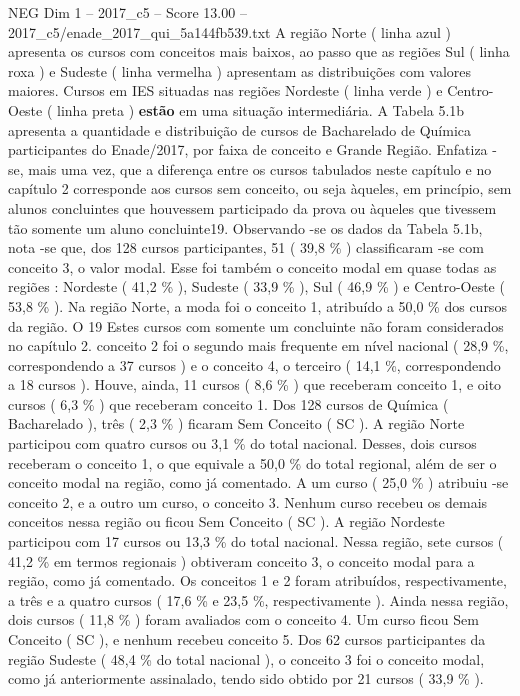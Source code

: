 \begin{textsample}{NEG Dim 1 – 2017\_c5 – Score 13.00 – 2017\_c5/enade\_2017\_qui\_5a144fb539.txt}
A região Norte ( linha azul ) apresenta os cursos com conceitos mais baixos, ao passo que as regiões Sul ( linha roxa ) e Sudeste ( linha vermelha ) apresentam as distribuições com valores maiores.
Cursos em IES situadas nas regiões Nordeste ( linha verde ) e Centro-Oeste ( linha preta ) \textbf{estão} em uma situação intermediária.
A Tabela 5.1b apresenta a quantidade e distribuição de cursos de Bacharelado de Química participantes do Enade/2017, por faixa de conceito e Grande Região.
Enfatiza -se, mais uma vez, que a diferença entre os cursos tabulados neste capítulo e no capítulo 2 corresponde aos cursos sem conceito, ou seja àqueles, em princípio, sem alunos concluintes que houvessem participado da prova ou àqueles que tivessem tão somente um aluno concluinte19.
Observando -se os dados da Tabela 5.1b, nota -se que, dos 128 cursos participantes, 51 ( 39,8 \% ) classificaram -se com conceito 3, o valor modal.
Esse foi também o conceito modal em quase todas as regiões : Nordeste ( 41,2 \% ), Sudeste ( 33,9 \% ), Sul ( 46,9 \% ) e Centro-Oeste ( 53,8 \% ).
Na região Norte, a moda foi o conceito 1, atribuído a 50,0 \% dos cursos da região.
O 19 Estes cursos com somente um concluinte não foram considerados no capítulo 2. conceito 2 foi o segundo mais frequente em nível nacional ( 28,9 \%, correspondendo a 37 cursos ) e o conceito 4, o terceiro ( 14,1 \%, correspondendo a 18 cursos ).
Houve, ainda, 11 cursos ( 8,6 \% ) que receberam conceito 1, e oito cursos ( 6,3 \% ) que receberam conceito 1.
Dos 128 cursos de Química ( Bacharelado ), três ( 2,3 \% ) ficaram Sem Conceito ( SC ).
A região Norte participou com quatro cursos ou 3,1 \% do total nacional.
Desses, dois cursos receberam o conceito 1, o que equivale a 50,0 \% do total regional, além de ser o conceito modal na região, como já comentado.
A um curso ( 25,0 \% ) atribuiu -se conceito 2, e a outro um curso, o conceito 3.
Nenhum curso recebeu os demais conceitos nessa região ou ficou Sem Conceito ( SC ).
A região Nordeste participou com 17 cursos ou 13,3 \% do total nacional.
Nessa região, sete cursos ( 41,2 \% em termos regionais ) obtiveram conceito 3, o conceito modal para a região, como já comentado.
Os conceitos 1 e 2 foram atribuídos, respectivamente, a três e a quatro cursos ( 17,6 \% e 23,5 \%, respectivamente ).
Ainda nessa região, dois cursos ( 11,8 \% ) foram avaliados com o conceito 4.
Um curso ficou Sem Conceito ( SC ), e nenhum recebeu conceito 5.
Dos 62 cursos participantes da região Sudeste ( 48,4 \% do total nacional ), o conceito 3 foi o conceito modal, como já anteriormente assinalado, tendo sido obtido por 21 cursos ( 33,9 \% ).

\end{textsample}
